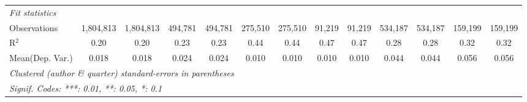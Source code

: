 \begin{tabular}{lcccccccccccc}
   \midrule
   \emph{Fit statistics}\\
   Observations                             & 1,804,813     & 1,804,813       & 494,781       & 494,781         & 275,510       & 275,510   & 91,219       & 91,219    & 534,187       & 534,187       & 159,199       & 159,199\\  
   R$^2$                                    & 0.20          & 0.20            & 0.23          & 0.23            & 0.44          & 0.44      & 0.47         & 0.47      & 0.28          & 0.28          & 0.32          & 0.32\\  
Mean(Dep. Var.) & 0.018 & 0.018 & 0.024 & 0.024 & 0.010 & 0.010 & 0.010 & 0.010 & 0.044 & 0.044 & 0.056 & 0.056 \\
   \midrule \midrule
   \multicolumn{13}{l}{\emph{Clustered (author \& quarter) standard-errors in parentheses}}\\
   \multicolumn{13}{l}{\emph{Signif. Codes: ***: 0.01, **: 0.05, *: 0.1}}\\
\end{tabular}
\par\endgroup
